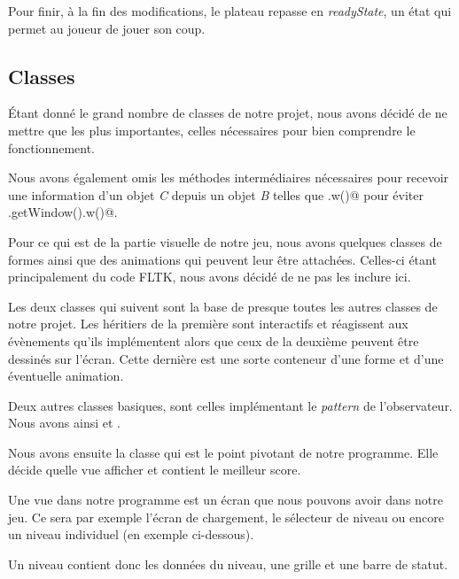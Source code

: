 \documentclass[11pt,a4paper]{article}
\newcommand{\addcode}[3]{
	\begin{figure}[H]
		\centering
		
	\end{figure}
}
\begin{document}
Pour finir, à la fin des modifications, le plateau repasse en \emph{readyState}, un état qui permet au 
joueur de jouer son coup.

\subsection{Classes}

Étant donné le grand nombre de classes de notre projet, nous
avons décidé de ne mettre que les plus importantes, celles
nécessaires pour bien comprendre le fonctionnement.

Nous avons également omis les méthodes intermédiaires
nécessaires pour recevoir une information d'un objet
\emph{C} depuis un objet \emph{B} telles que \verb@b.w()@ pour
éviter \verb@b.getWindow().w()@.

Pour ce qui est de la partie visuelle de notre jeu, nous
avons quelques classes de formes ainsi que des animations
qui peuvent leur être attachées. Celles-ci étant
principalement du code FLTK, nous avons décidé de ne pas les
inclure ici.

Les deux classes qui suivent sont la base de presque toutes
les autres classes de notre projet. Les héritiers de la
première sont interactifs et réagissent aux évènements
qu'ils implémentent alors que ceux de la deuxième peuvent
être dessinés sur l'écran. Cette dernière est une sorte conteneur d'une forme et
d'une éventuelle animation.

\addcode{code/interactive.hpp}{C++}{}{}
\addcode{code/drawableContainer.hpp}{C++}{}{}

Deux autres classes basiques, sont celles implémentant le
\emph{pattern} de l'observateur. Nous avons ainsi \verb@Observer@
et \verb@Subject@.

Nous avons ensuite la classe \verb@Game@ qui est le point
pivotant de notre programme. Elle décide quelle vue
afficher et contient le meilleur score.

Une vue dans notre programme est un écran que nous pouvons
avoir dans notre jeu. Ce sera par exemple l'écran de
chargement, le sélecteur de niveau ou encore un niveau
individuel (en exemple ci-dessous).

\addcode{code/game.hpp}{C++}{}{}

\addcode{code/view.hpp}{C++}{}{}
\addcode{code/level.hpp}{C++}{}{}

Un niveau contient donc les données du niveau, une grille
et une barre de statut.
\end{document}
